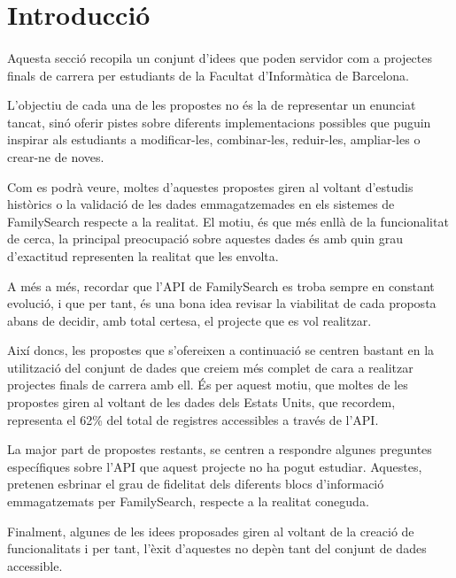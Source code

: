 \section{Introducció}

    \paragraph{}
    Aquesta secció recopila un conjunt d'idees que poden servidor com a projectes finals de carrera per estudiants de la Facultat d'Informàtica de Barcelona.

    L'objectiu de cada una de les propostes no és la de representar un enunciat tancat, sinó oferir pistes sobre diferents implementacions possibles que puguin inspirar als estudiants a modificar-les, combinar-les, reduir-les, ampliar-les o crear-ne de noves.

    Com es podrà veure, moltes d'aquestes propostes giren al voltant d'estudis històrics o la validació de les dades emmagatzemades en els sistemes de FamilySearch respecte a la realitat. El motiu, és que més enllà de la funcionalitat de cerca, la principal preocupació sobre aquestes dades és amb quin grau d'exactitud representen la realitat que les envolta.

    A més a més, recordar que l'API de FamilySearch es troba sempre en constant evolució, i que per tant, és una bona idea revisar la viabilitat de cada proposta abans de decidir, amb total certesa, el projecte que es vol realitzar.

    Així doncs, les propostes que s’ofereixen a continuació se centren bastant en la utilització del conjunt de dades que creiem més complet de cara a realitzar projectes finals de carrera amb ell. És per aquest motiu, que moltes de les propostes giren al voltant de les dades dels Estats Units, que recordem, representa el 62\% del total de registres accessibles a través de l’API.

    La major part de propostes restants, se centren a respondre algunes preguntes específiques sobre l’API que aquest projecte no ha pogut estudiar. Aquestes, pretenen esbrinar el grau de fidelitat dels diferents blocs d’informació emmagatzemats per FamilySearch, respecte a la realitat coneguda.

    Finalment, algunes de les idees proposades giren al voltant de la creació de funcionalitats i per tant, l’èxit d’aquestes no depèn tant del conjunt de dades accessible.
